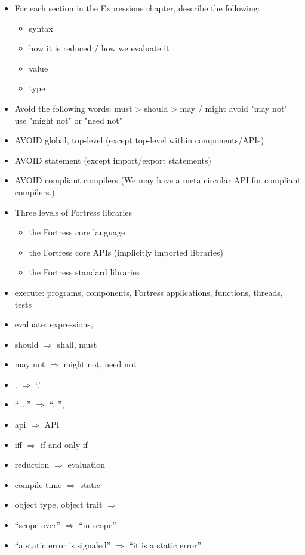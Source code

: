 \begin{itemize}
\item For each section in the Expressions chapter, describe the following:
  \begin{itemize}
  \item syntax
  \item how it is reduced / how we evaluate it
  \item value
  \item type
  \end{itemize}

\item Avoid the following words:
 must > should > may / might
 avoid "may not"
 use "might not" or "need not"
  \item AVOID global, top-level (except top-level within components/APIs)
  \item AVOID statement (except import/export statements)
  \item AVOID compliant compilers (We may have a meta circular API for
  compliant compilers.)
  \item Three levels of Fortress libraries
    \begin{itemize}
    \item the Fortress core language
    \item the Fortress core APIs (implicitly imported libraries)
    \item the Fortress standard libraries
    \end{itemize}
  \item execute: programs, components, Fortress applications, functions,
  threads, tests
  \item evaluate: expressions,
  \item should $\Rightarrow$ shall, must
  \item may not $\Rightarrow$ might not, need not
  \item . $\Rightarrow$ `.'
  \item ``...,'' $\Rightarrow$ ``...'',
  \item api $\Rightarrow$ API
  \item iff $\Rightarrow$ if and only if
  \item reduction $\Rightarrow$ evaluation
  \item compile-time $\Rightarrow$ static
  \item object type, object trait  $\Rightarrow$ \objecttype
  \item ``scope over'' $\Rightarrow$ ``in scope''
  \item ``a static error is signaled'' $\Rightarrow$ ``it is a static error''

\end{itemize}
